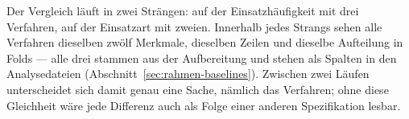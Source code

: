 \documentclass[12pt,a4paper]{article}
\begin{document}
%

Der Vergleich läuft in zwei Strängen: auf der Einsatzhäufigkeit mit drei
Verfahren, auf der Einsatzart mit zweien. Innerhalb jedes Strangs sehen alle
Verfahren dieselben zwölf Merkmale, dieselben Zeilen und dieselbe Aufteilung in
Folds --- alle drei stammen aus der Aufbereitung und stehen als Spalten in den
Analysedateien (Abschnitt~\ref{sec:rahmen-baselines}). Zwischen zwei Läufen
unterscheidet sich damit genau eine Sache, nämlich das Verfahren; ohne diese
Gleichheit wäre jede Differenz auch als Folge einer anderen Spezifikation
lesbar.
\end{document}
